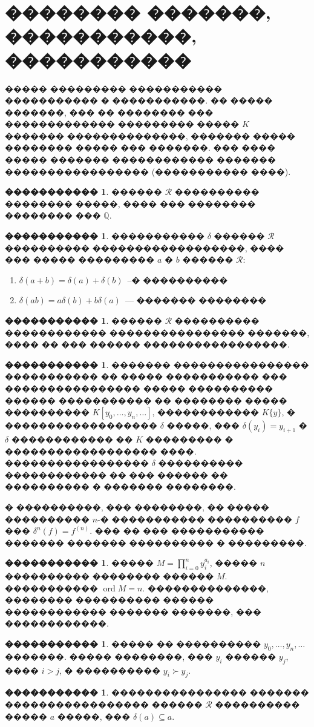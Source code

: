 \documentclass[16pt]{article}
\DeclareMathOperator{\ord}{ord}
\theoremstyle{plain}
\theoremstyle{definition}
\newtheorem{definition}[theorem]{�����������}
\theoremstyle{remark}
\begin{document}
\section{�������� �������, �����������, �����������}
����� ��������� ����������� ����������� � �����������. �� ����� �������, ��� �� �������� ��� ������������� ��������� ����� ${K}$ ������� ��������������, ������� ����� �������� ����� ��� �������. ��� ���� ����� ������� ������������ ������� ����������������� (����������� ����).

\begin{definition}
������ $\mathcal{R}$ ���������� �������� �����, ���� ��� �������� �������� ��� $ \mathbb{Q} $.
\end{definition}

\begin{definition}
����������� $\delta$ ������ $\mathcal{R}$ ���������� ������������������, ���� ��� ����� ��������� $a$ � $b$ ������ $\mathcal{R}$:

\begin{enumerate}
  \item $\delta(a+b)= \delta(a)+\delta(b)$~--� ����������
  \item $\delta(ab)=a\delta(b)+b\delta(a)$~--- ������� ��������
\end{enumerate}

\end{definition}

\begin{definition}
������ $\mathcal{R}$ ���������� ������������ ���������������� �������, ���� �� ��� ������ �����������������.
\end{definition}

\begin{definition}
������� ���������������� ����������� �� ����� ����������� ��� ���������������� ����� ���������� ������ ����������� �� �������� ����� ���������� ${K}[y_0,\ldots,y_n,\ldots]$, ������������ ${K}\{y\}$, � ������������������ $\delta$ �����, ��� $\delta(y_i)=y_{i+1}$ �  $\delta$ ������������ �� ${K}$ ��������� � ������������������ ����. ����������������� $\delta$ ���������� ������������ �� ��� ������ �� ���������� � ������� ��������.
\end{definition}

� ����������, ��� ��������, �� ����� ���������� $n$-� ����������� ���������� $f$ ��� $\delta^n(f)=f^{(n)}$. ��� �� ��� ����������� ������� ������� ���������� � ���������.
\begin{definition}
����� $M = \prod\limits_{i=0}^ny_i^{a_i}$,  ����� $n$ ���������� �������� ������ $M$. ����������� $\ord M=n$. ��������������, �������� ���������� ������ ������������ �������
�������, ��� ������������.
\end{definition}
\begin{definition}
����� �� ���������� $y_0,\ldots,y_n,\ldots$ �������. ����� ��������, ��� $y_i$ ������ $y_j$, ���� $i>j$, � ���������� $y_i\succ y_j$.
\end{definition}
\begin{definition}
���������������� ������� ����������������� ������ $\mathcal{R}$  ���������� ����� $a$ �����, ��� $\delta(a)\subseteq a$.
\end{definition}
\end{document}
